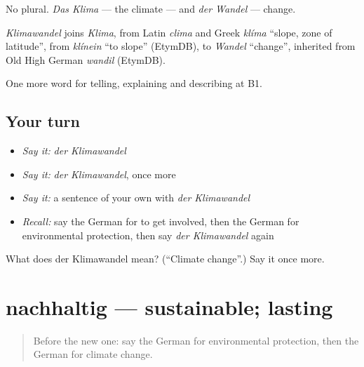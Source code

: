 No plural. \emph{Das Klima} — the climate — and \emph{der Wandel} — change.

\begin{cousinweb}
\emph{Klimawandel} joins \emph{Klima}, from Latin \emph{clima} and Greek \emph{klíma} \textquotedblleft{}slope, zone of latitude\textquotedblright{}, from \emph{klínein} \textquotedblleft{}to slope\textquotedblright{} (EtymDB), to \emph{Wandel} \textquotedblleft{}change\textquotedblright{}, inherited from Old High German \emph{wandil} (EtymDB).
\end{cousinweb}

\begin{grammarlens}[title={What you've built}]
One more word for telling, explaining and describing at B1.
\end{grammarlens}

\subsection*{Your turn}
\begin{itemize}
\raggedright
  \item \emph{Say it:} \emph{der Klimawandel}
  \item \emph{Say it:} \emph{der Klimawandel}, once more
  \item \emph{Say it:} a sentence of your own with \emph{der Klimawandel}
  \item \emph{Recall:} say the German for to get involved, then the German for environmental protection, then say \emph{der Klimawandel} again
\end{itemize}

\begin{tcolorbox}[breakable,colback=teal!4,colframe=teal!35!black,title={Before you move on}]
What does der Klimawandel mean? (\textquotedblleft{}Climate change\textquotedblright{}.) Say it once more.
\end{tcolorbox}
\section[nachhaltig]{nachhaltig — sustainable; lasting}

\label{lesson:GE-C363-nachhaltig}



\begin{quote}
Before the new one: say the German for environmental protection, then the German for climate change.
\end{quote}

